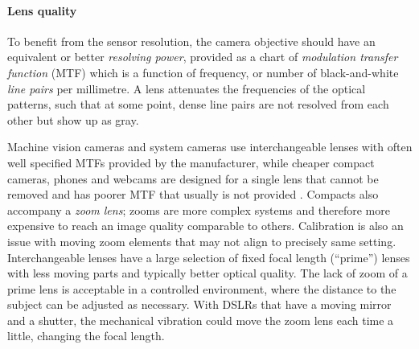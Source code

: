 

\paragraph{Lens quality}
To benefit from the sensor resolution, the camera objective should have an equivalent or better \emph{resolving power}, provided as a chart of \emph{modulation transfer function} (MTF) which is a function of frequency, or number of black-and-white \emph{line pairs} per millimetre.
A lens attenuates the frequencies of the optical patterns, such that at some point, dense line pairs are not resolved from each other but show up as gray.
\cite[p. 71]{kingslake1992optics}

Machine vision cameras and system cameras use interchangeable lenses with often well specified MTFs provided by the manufacturer, while cheaper compact cameras, phones and webcams are designed for a single lens that cannot be removed and has poorer MTF that usually is not provided \cite{sick2006machine}.
Compacts also accompany a \emph{zoom lens}; zooms are more complex systems and therefore more expensive to reach an image quality comparable to others.
Calibration is also an issue with moving zoom elements that may not align to precisely same setting.
Interchangeable lenses have a large selection of fixed focal length (``prime'') lenses with less moving parts and typically better optical quality.
The lack of zoom of a prime lens is acceptable in a controlled environment, where the distance to the subject can be adjusted as necessary.
With DSLRs that have a moving mirror and a shutter, the mechanical vibration could move the zoom lens each time a little, changing the focal length.


